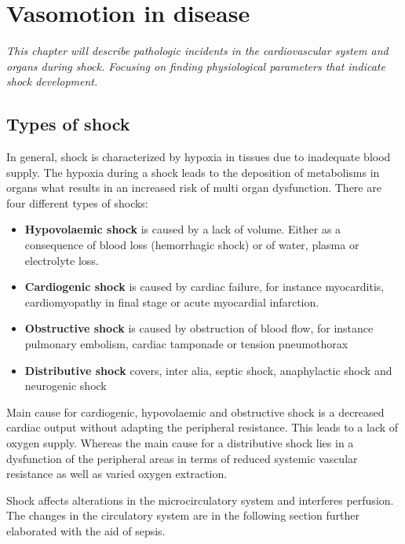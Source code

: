 \chapter{Vasomotion in disease}
\textit{This chapter will describe pathologic incidents in the cardiovascular system and organs during shock. Focusing on finding physiological parameters that indicate shock development.}

\section{Types of shock}
In general, shock is characterized by hypoxia in tissues due to inadequate blood supply. The hypoxia during a shock leads to the deposition of metabolisms in organs what results in an increased risk of multi organ dysfunction. 
There are four different types of shocks:\cite{lauridsen2015,vincent2013}
\begin{itemize}
	\item \textbf{Hypovolaemic shock} is caused by a lack of volume. Either as a consequence of blood loss (hemorrhagic shock) or of water, plasma or electrolyte loss.
	\item \textbf{Cardiogenic shock} is caused by cardiac failure, for instance myocarditis, cardiomyopathy in final stage or acute myocardial infarction.
	\item \textbf{Obstructive shock} is caused by obstruction of blood flow, for instance pulmonary embolism, cardiac tamponade or tension pneumothorax 
	\item \textbf{Distributive shock} covers, inter alia, septic shock, anaphylactic shock and neurogenic shock
\end{itemize}

Main cause for cardiogenic, hypovolaemic and obstructive shock is a decreased cardiac output without adapting the peripheral resistance. This leads to a lack of oxygen supply.
Whereas the main cause for a distributive shock lies in a dysfunction of the peripheral areas in terms of reduced systemic vascular resistance as well as varied oxygen extraction.\cite{vincent2013}

Shock affects alterations in the microcirculatory system and interferes perfusion\cite{maier2013}. The changes in the circulatory system are in the following section further elaborated with the aid of sepsis.